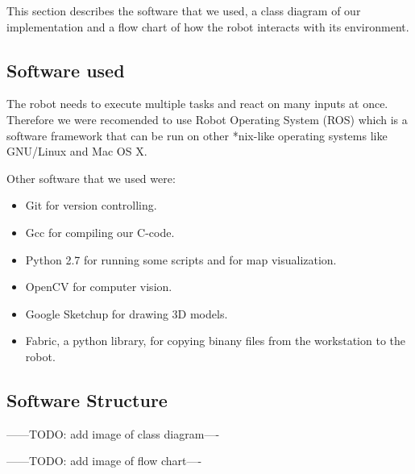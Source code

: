 This section describes the software that we used, a class diagram of our implementation and a flow chart of how the robot interacts with its environment.

\subsection{Software used}
The robot needs to execute multiple tasks and react on many inputs at once. Therefore we were recomended to use Robot Operating System (ROS) which is a software framework that can be run on other *nix-like operating systems like GNU/Linux and Mac OS X.

Other software that we used were:
\begin{itemize}
\item Git for version controlling.
\item Gcc for compiling our C-code.
\item Python 2.7 for running some scripts and for map visualization.
\item OpenCV for computer vision.
\item Google Sketchup for drawing 3D models.
\item Fabric, a python library, for copying binany files from the workstation to the robot.
\end{itemize}

\subsection{Software Structure}

\-------TODO: add image of class diagram----\

\-------TODO: add image of flow chart----\

